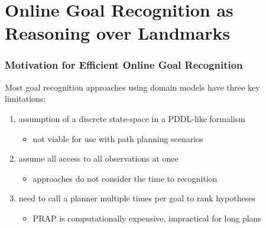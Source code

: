 \documentclass{beamer}
\begin{document}
\section{Online Goal Recognition as Reasoning over Landmarks}

	\begin{frame}[c]\frametitle{Motivation for Efficient Online Goal Recognition}
		Most goal recognition approaches using domain models have three key limitations:
		\begin{enumerate}
			\item assumption of a discrete state-space in a PDDL-like formalism
			\begin{itemize}
				\item not viable for use with path planning scenarios
			\end{itemize}
			\item assume all access to all observations at once
			\begin{itemize}
				\item approaches do not consider the time to recognition
			\end{itemize}
			\item need to call a planner multiple times per goal to rank hypotheses
			\begin{itemize}
				\item PRAP is computationally expensive, impractical for long plans
			\end{itemize}
		\end{enumerate}
	\end{frame}
	
\end{document}
